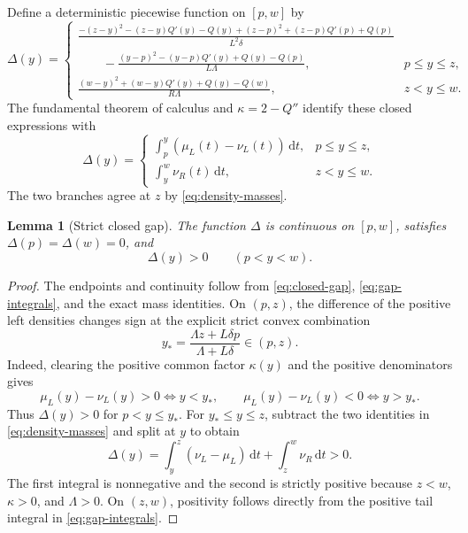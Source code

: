 \documentclass[11pt]{article}
\newtheorem{lemma}[theorem]{Lemma}
\theoremstyle{remark}
\newcommand{\dd}{\,\mathrm{d}}
\numberwithin{equation}{section}
\begin{document}
Define a deterministic piecewise function on \([p,w]\) by
\begin{equation}\label{eq:closed-gap}
 \Delta(y)=
 \begin{cases}
 \displaystyle
 \frac{-(z-y)^2-(z-y)Q'(y)-Q(y)+(z-p)^2+(z-p)Q'(p)+Q(p)}
      {L^2\delta}\\[3pt]
 \displaystyle\qquad
 -\frac{(y-p)^2-(y-p)Q'(y)+Q(y)-Q(p)}{L\Lambda},
 &p\leq y\leq z,\\[12pt]
 \displaystyle
 \frac{(w-y)^2+(w-y)Q'(y)+Q(y)-Q(w)}{R\Lambda},
 &z<y\leq w.
 \end{cases}
\end{equation}
The fundamental theorem of calculus and \(\kappa=2-Q''\) identify these
closed expressions with
\begin{equation}\label{eq:gap-integrals}
 \Delta(y)=
 \begin{cases}
 \displaystyle\int_p^y(\mu_L(t)-\nu_L(t))\dd t,&p\leq y\leq z,\\[6pt]
 \displaystyle\int_y^w\nu_R(t)\dd t,&z<y\leq w.
 \end{cases}
\end{equation}
The two branches agree at \(z\) by \eqref{eq:density-masses}.

\begin{lemma}[Strict closed gap]\label{lem:crossing}
The function \(\Delta\) is continuous on \([p,w]\), satisfies
\(\Delta(p)=\Delta(w)=0\), and
\[
 \Delta(y)>0\qquad(p<y<w).
\]
\end{lemma}

\begin{proof}
The endpoints and continuity follow from \eqref{eq:closed-gap},
\eqref{eq:gap-integrals}, and the exact mass identities. On \((p,z)\), the
difference of the positive left densities changes sign at the explicit strict
convex combination
\[
 y_* = \frac{\Lambda z+L\delta p}{\Lambda+L\delta}\in(p,z).
\]
Indeed, clearing the positive common factor \(\kappa(y)\) and the positive
denominators gives
\[
 \mu_L(y)-\nu_L(y)>0\iff y<y_*,
 \qquad
 \mu_L(y)-\nu_L(y)<0\iff y>y_*.
\]
Thus \(\Delta(y)>0\) for \(p<y\leq y_*\). For \(y_*\leq y\leq z\), subtract
the two identities in \eqref{eq:density-masses} and split at \(y\) to obtain
\[
 \Delta(y)=\int_y^z(\nu_L-\mu_L)\dd t+\int_z^w\nu_R\dd t>0.
\]
The first integral is nonnegative and the second is strictly positive because
\(z<w\), \(\kappa>0\), and \(\Lambda>0\). On \((z,w)\), positivity follows
directly from the positive tail integral in \eqref{eq:gap-integrals}.
\end{proof}
\end{document}

